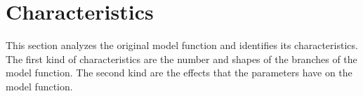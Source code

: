\section{Characteristics}
\label{sec:setup.char}

This section analyzes the original model function and identifies its characteristics.
The first kind of characteristics are the number and shapes of the branches of the model function.
The second kind are the effects that the parameters have on the model function.




